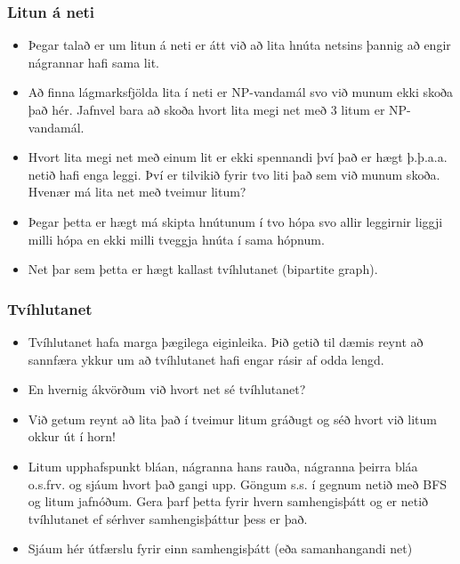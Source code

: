 \documentclass{beamer}
\begin{document}
\begin{frame}
\frametitle{Litun á neti}

\begin{itemize}

\item<1-> Þegar talað er um litun á neti er átt við að lita hnúta netsins þannig að engir nágrannar hafi sama lit.

\item<2-> Að finna lágmarksfjölda lita í neti er NP-vandamál svo við munum ekki skoða það hér. Jafnvel bara að skoða hvort lita megi net með 3 litum er NP-vandamál.

\item<3-> Hvort lita megi net með einum lit er ekki spennandi því það er hægt þ.þ.a.a. netið hafi enga leggi. Því er tilvikið fyrir tvo liti það sem við munum skoða. Hvenær má lita net með tveimur litum?

\item<4-> Þegar þetta er hægt má skipta hnútunum í tvo hópa svo allir leggirnir liggji milli hópa en ekki milli tveggja hnúta í sama hópnum.

\item<5-> Net þar sem þetta er hægt kallast tvíhlutanet (bipartite graph).

\end{itemize}

\end{frame}

\begin{frame}
\frametitle{Tvíhlutanet}

\begin{itemize}

\item<1-> Tvíhlutanet hafa marga þægilega eiginleika. Þið getið til dæmis reynt að sannfæra ykkur um að tvíhlutanet hafi engar rásir af odda lengd.

\item<2-> En hvernig ákvörðum við hvort net sé tvíhlutanet?

\item<3-> Við getum reynt að lita það í tveimur litum gráðugt og séð hvort við litum okkur út í horn!

\item<4-> Litum upphafspunkt bláan, nágranna hans rauða, nágranna þeirra bláa o.s.frv. og sjáum hvort það gangi upp. Göngum s.s. í gegnum netið með BFS og litum jafnóðum. Gera þarf þetta fyrir hvern samhengisþátt og er netið tvíhlutanet ef sérhver samhengisþáttur þess er það.

\item<5-> Sjáum hér útfærslu fyrir einn samhengisþátt (eða samanhangandi net)

\end{itemize}

\end{frame}
\end{document}
